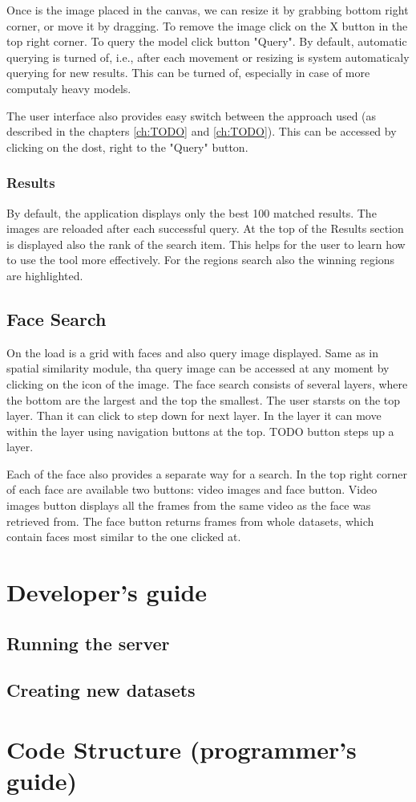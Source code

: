 Once is the image placed in the canvas, we can resize it by grabbing bottom right corner, or move it by dragging. To remove the image click on the X button in the top right corner. To query the model click button "Query". By default, automatic querying is turned of, i.e., after each movement or resizing is system automaticaly querying for new results. This can be turned of, especially in case of more computaly heavy models.

The user interface also provides easy switch between the approach used (as described in the chapters \ref{ch:TODO} and \ref{ch:TODO}). This can be accessed by clicking on the dost, right to the "Query" button. 

\subsection*{Results}

By default, the application displays only the best 100 matched results. The images are reloaded after each successful query. At the top of the Results section is displayed also the rank of the search item. This helps for the user to learn how to use the tool more effectively. For the regions search also the winning regions are highlighted.


\section{Face Search}

On the load is a grid with faces and also query image displayed. Same as in spatial similarity module, tha query image can be accessed at any moment by clicking on the icon of the image. The face search consists of several layers, where the bottom are the largest and the top the smallest. The user starsts on the top layer. Than it can click to step down for next layer. In the layer it can move within the layer using navigation buttons at the top. TODO button steps up a layer.

Each of the face also provides a separate way for a search. In the top right corner of each face are available two buttons: video images and face button. Video images button displays all the frames from the same video as the face was retrieved from. The face button returns frames from whole datasets, which contain faces most similar to the one clicked at.

\chapter{Developer's guide}

\section{Running the server}

\section{Creating new datasets}



\chapter{Code Structure (programmer's guide)}


